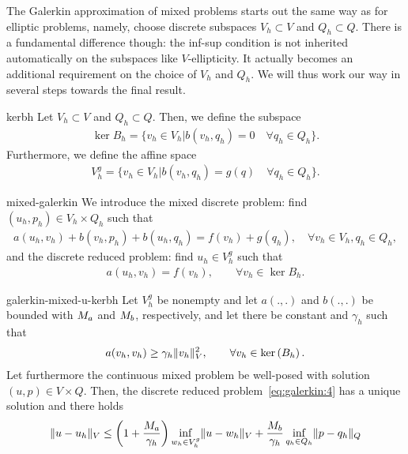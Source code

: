 \begin{intro}
  The Galerkin approximation of mixed problems starts out the same way
  as for elliptic problems, namely, choose discrete subspaces
  $V_h\subset V$ and $Q_h \subset Q$. There is a fundamental
  difference though: the inf-sup condition is not inherited
  automatically on the subspaces like $V$-ellipticity. It actually becomes
  an additional requirement on the choice of $V_h$ and
  $Q_h$. We will thus work our way in several steps towards the final
  result.
\end{intro}

\begin{Definition}{kerbh}
  Let $V_h\subset V$ and $Q_h\subset Q$. Then, we define the subspace
  \begin{gather}
    \label{eq:galerkin:1}
    \ker{B_h} = \bigl\{v_h\in V_h \big|
    b(v_h, q_h) = 0 \quad\forall q_h\in Q_h
    \bigr\}.
  \end{gather}
  Furthermore, we define the affine space
  \begin{gather}
    \label{eq:galerkin:2}
    V_h^g = \bigl\{v_h\in V_h \big|
    b(v_h, q_h) = g(q) \quad\forall q_h\in Q_h
    \bigr\}.
  \end{gather}
\end{Definition}


\begin{Definition}{mixed-galerkin}
  We introduce the mixed discrete problem: find $(u_h, p_h)\in
  V_h\times Q_h$ such that
  \begin{gather}
    \label{eq:galerkin:3}
    a(u_h, v_h) + b(v_h, p_h) + b(u_h, q_h) = f(v_h)+g(q_h),
    \quad\forall v_h\in V_h, q_h\in Q_h,
  \end{gather}
  and the discrete reduced problem: find $u_h\in V_h^g$ such that
  \begin{gather}
    \label{eq:galerkin:4}
    a(u_h, v_h) = f(v_h), \qquad\forall v_h \in \ker{B_h}.
  \end{gather}
\end{Definition}

\begin{Theorem}{galerkin-mixed-u-kerbh}
  Let $V_h^g$ be nonempty and let $a(.,.)$ and $b(.,.)$ be bounded
  with $M_a$ and $M_b$, respectively, and let there be constant and $\gamma_h$
  such that
  \begin{gather}
    \label{eq:galerkin:5}
    a(v_h, v_h) \ge \gamma_h \lVert v_h\rVert^2_V,
    \qquad\forall v_h\in \operatorname{ker}\left(B_h\right).
  \end{gather}
  Let furthermore the continuous mixed problem be well-posed with
  solution $(u,p)\in V\times Q$.
  Then, the discrete reduced problem~\eqref{eq:galerkin:4} has a
  unique solution and there holds
  \begin{gather}
    \label{eq:galerkin:8}
    \lVert u-u_h\rVert_V \le \left(1+\frac{M_a}{\gamma_h}\right)
    \inf_{w_h\in V_h^g}\lVert u-w_h\rVert_V
    + \frac{M_b}{\gamma_h}
    \inf_{q_h\in Q_h}\lVert p-q_h\rVert_Q
  \end{gather}
\end{Theorem}

